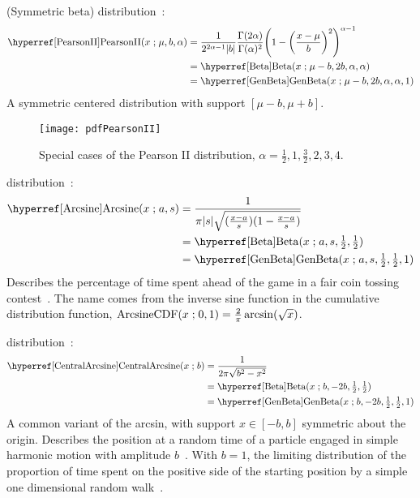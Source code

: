  (Symmetric beta) distribution~\cite{Pearson1895}: 
%
\begin{align}
\label{PearsonII}
\opr{PearsonII}(x\given \mu, b,\alpha) 
&= \frac{1}{2^{2\alpha-1}  |b|}\frac{\Gamma(2\alpha) }{ \Gamma(\alpha)^2 } \Left(1-\Left(\frac{x-\mu}{ b}\Right)^2 \Right)^{\alpha-1}
\checked
 \\
& = \opr{Beta}(x\given \mu-b, 2b,\alpha, \alpha) \notag  \\
\checked
& = \opr{GenBeta}(x\given \mu-b, 2 b ,\alpha, \alpha,1) \notag
\checked
\end{align}
A symmetric centered distribution with support $[\mu-b, \mu+b]$.

\begin{figure}[tp!]
\begin{center}
\texttt{[image: pdfPearsonII]}
\end{center}
\caption[Pearson II distributions]{Special cases of the Pearson II distribution, $\alpha=\tfrac{1}{2}, 1, \tfrac{3}{2}, 2, 3, 4$.}
\end{figure}


 distribution~\cite{Norton1975}:
\begin{align}
\label{Arcsine}
\opr{Arcsine}(x\given a, s) &= \frac{1}{\pi |s| \sqrt{(\tfrac{x-a}{s}) (1-\frac{x-a}{s} )}} \checked \\
& =\opr{Beta}(x\given a,s,   \tfrac{1}{2},  \tfrac{1}{2}) \notag \checked \\
& =\opr{GenBeta}(x\given a,s, \tfrac{1}{2}, \tfrac{1}{2},1) \notag \checked
\end{align}
Describes the percentage of time spent ahead of the game in a fair coin tossing contest~\cite{Johnson1995,Norton1975}. The name comes from the inverse sine function in the cumulative distribution function,
$
\operatorname{ArcsineCDF}(x\mathrel{;} 0,1) = \frac{2}{\pi} \operatorname{arcsin}( \sqrt{x}) 
$.



 
 distribution~\cite{Norton1975}: 
\begin{align}
\label{CentralArcsine}
\opr{CentralArcsine}(x\given b) &= \frac{1}{2 \pi  \sqrt{b^2-x^2}} \checked \\
& =\opr{Beta}(x\given b,-2b, \tfrac{1}{2}, \tfrac{1}{2})  \checked \notag \\
& =\opr{GenBeta}(x\given b,-2b, \tfrac{1}{2}, \tfrac{1}{2},1)  \checked \notag
\end{align}
A common variant of the arcsin, with support $x\in [-b,b]$ symmetric about the origin. Describes the position at a random time of a particle engaged in simple harmonic motion with amplitude $b$~\cite{Norton1975}. With $b=1$, the limiting distribution of the proportion of time spent on the positive side of the starting position by a simple one dimensional random walk~\cite{Feller1968}.


